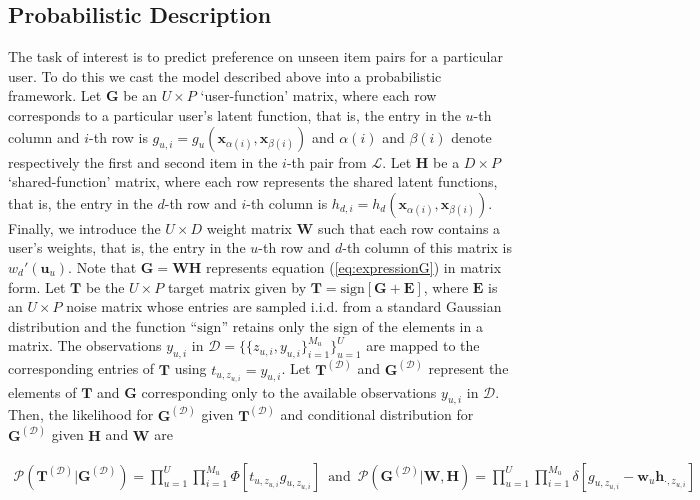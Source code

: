 \subsection{Probabilistic Description}

The task of interest is to predict preference on unseen item pairs for a particular user.
To do this we cast the model described above into a probabilistic framework.
Let $\mathbf{G}$ be an $U\times P$ `user-function' matrix, where each row corresponds to
a particular user's latent function, that is, the entry in the $u$-th column and $i$-th row is 
$g_{u,i}= g_u(\mathbf{x}_{\alpha(i)},\mathbf{x}_{\beta(i)})$
and $\alpha(i)$ and $\beta(i)$ denote respectively the first and second item in the $i$-th pair from $\mathcal{L}$.
Let $\mathbf{H}$ be a $D\times P$ `shared-function' matrix,
where each row represents the shared latent functions, that is, the entry in the $d$-th row and $i$-th column is 
$h_{d,i}= h_d(\mathbf{x}_{\alpha(i)},\mathbf{x}_{\beta(i)})$.
Finally, we introduce the $U \times D$ weight matrix $\mathbf{W}$ such that each row contains a user's weights, that is, the entry in the $u$-th row and $d$-th column of this matrix is $w_d'(\mathbf{u}_u)$.
Note that $\mathbf{G} = \mathbf{W} \mathbf{H}$ represents equation (\ref{eq:expressionG}) in matrix form.
Let $\mathbf{T}$ be the $U\times P$ target matrix given by $\mathbf{T} = \text{sign}[\mathbf{G} + \mathbf{E}]$,
where $\mathbf{E}$ is an $U \times P$ noise matrix whose entries are sampled i.i.d. from a standard Gaussian distribution and
the function ``$\text{sign}$'' retains only the sign of the elements in a matrix. 
The observations $y_{u,i}$ in $\mathcal{D}=\{\{z_{u,i},y_{u,i}\}_{i=1}^{M_u}\}_{u=1}^{U}$ are
mapped to the corresponding entries of $\mathbf{T}$ using $t_{u,z_{u,i}} = y_{u,i}$.
Let $\mathbf{T}^{(\mathcal{D})}$ and $\mathbf{G}^{(\mathcal{D})}$ represent the elements of $\mathbf{T}$ and $\mathbf{G}$
corresponding only to the available observations $y_{u,i}$ in $\mathcal{D}$.
Then, the likelihood for $\mathbf{G}^{(\mathcal{D})}$ given $\mathbf{T}^{(\mathcal{D})}$ and conditional distribution for $\mathbf{G}^{(\mathcal{D})}$ given $\mathbf{H}$ and $\mathbf{W}$ are

\begin{align*}
\mathcal{P}(\mathbf{T}^{(\mathcal{D})}|\mathbf{G}^{(\mathcal{D})}) 
= \prod_{u=1}^U \prod_{i=1}^{M_u} \Phi[t_{u,z_{u,i}} g_{u,z_{u,i}}]\,\,\,\text{and}\,\,\,
\mathcal{P}(\mathbf{G}^{(\mathcal{D})}|\mathbf{W},\mathbf{H}) = 
\prod_{u=1}^{U} \prod_{i=1}^{M_u}\delta[g_{u,z_{u,i}}-\mathbf{w}_u\mathbf{h}_{\cdot,z_{u,i}}]\,
\end{align*}

